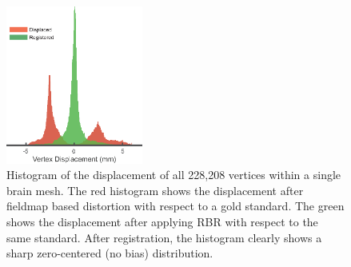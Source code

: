 \begin{figure}[!ht]
\centering
\includegraphics[width=0.4\textwidth, clip=true]{./Chapters/02_Registration/Images/./Histograms}
\caption{Histogram of the displacement of all 228,208 vertices within a single brain mesh. The {\color{red}red} histogram shows the displacement after fieldmap based distortion with respect to a gold standard. The {\color{green}green} shows the displacement after applying RBR with respect to the same standard. After registration, the histogram clearly shows a sharp zero-centered (no bias) distribution.}
\label{fig:registrationhistogram}
\end{figure}